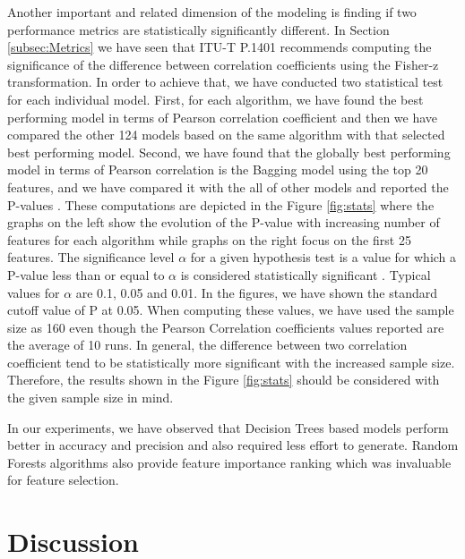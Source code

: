 \documentclass[journal]{IEEEtran}
\begin{document}
Another important and related dimension of the modeling is finding if two performance metrics are statistically significantly different. In Section \ref{subsec:Metrics} we have seen that ITU-T P.1401 \cite{itut2012P.1401} recommends computing the significance of the difference between correlation coefficients using the  Fisher-z transformation. In order to achieve that, we have conducted two statistical test for each individual model. First, for each algorithm, we have found the best performing model in terms of Pearson correlation coefficient and then we have compared the other 124 models based on the same algorithm with that selected best performing model. Second, we have found that the globally best performing model in terms of Pearson correlation is the Bagging model using the top 20 features, and we have compared it with the all of other models and reported the P-values \cite{sellke2001calibration}. These computations are depicted in the Figure \ref{fig:stats} where the graphs on the left show the evolution of the P-value with increasing number of features for each algorithm while graphs on the right focus on the first 25 features. The significance level $\alpha$ for a given hypothesis test is a value for which a P-value less than or equal to $\alpha$ is considered statistically significant \cite{sellke2001calibration}. Typical values for $\alpha$ are 0.1, 0.05 and 0.01. In the figures, we have shown the standard cutoff value of P at 0.05. When computing these values, we have used the sample size as 160 even though the Pearson Correlation coefficients values reported are the average of 10 runs. In general, the difference between two correlation coefficient tend to be statistically more significant with the increased sample size. Therefore, the results shown in the Figure \ref{fig:stats} should be considered with the given sample size in mind.

In our experiments, we have observed that Decision Trees based models perform better in accuracy and precision and also required less effort to generate. Random Forests algorithms also provide feature importance ranking which was invaluable for feature selection.

\section{Discussion}
\end{document}
